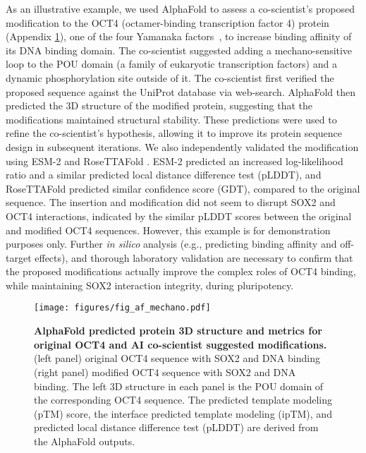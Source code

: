As an illustrative example, we used AlphaFold to assess a co-scientist's proposed modification to the OCT4 (octamer-binding transcription factor 4) protein (Appendix \cref{fig:fig_af}), one of the four Yamanaka factors~\citep{takahashi2007induction}, to increase binding affinity of its DNA binding domain. The co-scientist suggested adding a mechano-sensitive loop to the POU domain (a family of eukaryotic transcription factors) and a dynamic phosphorylation site outside of it. The co-scientist first verified the proposed sequence against the UniProt database via web-search. AlphaFold then predicted the 3D structure of the modified protein, suggesting that the modifications maintained structural stability. These predictions were used to refine the co-scientist's hypothesis, allowing it to improve its protein sequence design in subsequent iterations. We also independently validated the modification using ESM-2 \citep{lin2022language} and RoseTTAFold \citep{baek2021accurate}. ESM-2 predicted an increased log-likelihood ratio and a similar predicted local distance difference test (pLDDT), and RoseTTAFold predicted similar confidence score (GDT), compared to the original sequence. The insertion and modification did not seem to disrupt SOX2 and OCT4 interactions, indicated by the similar pLDDT scores between the original and modified OCT4 sequences. However, this example is for demonstration purposes only. Further \textit{in silico} analysis (e.g., predicting binding affinity and off-target effects), and thorough laboratory validation are necessary to confirm that the proposed modifications actually improve the complex roles of OCT4 binding, while maintaining SOX2 interaction integrity, during pluripotency.

\begin{figure}[htbp!]
\centering
\texttt{[image: figures/fig\_af\_mechano.pdf]}
\vspace{0.1cm}
\caption{\textbf{AlphaFold predicted protein 3D structure and metrics for original OCT4 and AI co-scientist suggested modifications.} (left panel) original OCT4 sequence with SOX2 and DNA binding (right panel) modified OCT4 sequence with SOX2 and DNA binding. The left 3D structure in each panel is the POU domain of the corresponding OCT4 sequence. The predicted template modeling (pTM) score, the interface predicted template modeling (ipTM), and predicted local distance difference test (pLDDT) are derived from the AlphaFold outputs.}
\label{fig:fig_af}
\end{figure}
\vspace{-0.3cm}

